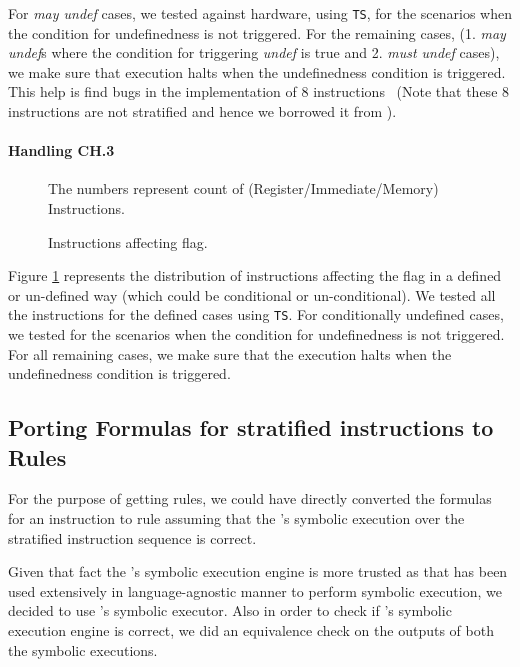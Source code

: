     For \emph{may undef} cases, we tested against hardware, using {\tt TS}, for the scenarios when the condition for undefinedness is not triggered. 
    For the remaining cases, (1. \emph{may undef}s where the condition for triggering \emph{undef} is true and 2. \emph{must undef} cases), we make sure that   \K execution halts when the undefinedness condition is triggered. This help is find bugs in the \Stoke implementation of $8$ instructions~\cite{BugStoke986} (Note that these $8$ instructions are not stratified and hence we borrowed it from \Stoke).   
    
    
   \paragraph{Handling CH.3}
   \begin{figure}[t]
       \centering
       \caption{Instructions affecting  flag.} The numbers represent count of (Register/Immediate/Memory) Instructions. 
       \label{fig:AD}
   \end{figure}

   Figure \ref{fig:AD} represents the distribution of instructions affecting the  flag
   in a defined or un-defined way (which could be conditional or un-conditional). 
   We tested all the instructions for the defined cases using {\tt TS}. For conditionally undefined cases, we tested for the scenarios when the condition for undefinedness is not triggered.  For all remaining cases,  we make sure that the \K execution halts when the undefinedness condition is triggered.        
   
   
   
\subsection{Porting Formulas for stratified instructions to \K Rules}

For the purpose of getting  \K rules, we could have directly converted the
\Strata formulas for an instruction to \K rule assuming that the \Strata's
symbolic execution over the stratified instruction sequence is correct.

Given that fact the \K's symbolic execution engine is more trusted as that has
been used extensively in language-agnostic manner to perform symbolic execution,
     we decided to use \K's symbolic executor. Also in order to check if
     \Strata's symbolic execution engine is correct, we did an equivalence check
     on the outputs of both the symbolic executions.   
 


